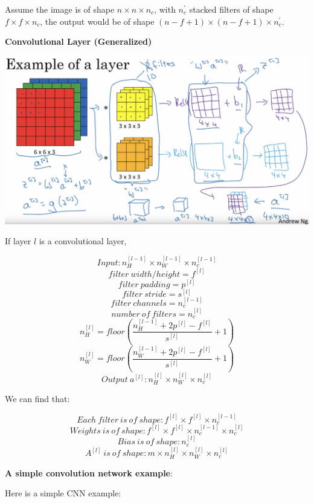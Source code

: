 \documentclass{article}
\begin{document}
\noindent Assume the image is of shape \(n \times n \times n_{c}\), with \(n_{c}^{'}\) stacked filters of shape \(f \times f \times n_{c}\), the output would be of shape \((n - f + 1) \times (n - f + 1) \times n_{c}^{'}\).

\bigskip

\noindent \textbf{Convolutional Layer (Generalized)}

\begin{center}
\includegraphics[scale=0.2]{./images/one_layer_of_a_convolutional_net.png}
\end{center}

\noindent If layer \(l\) is a convolutional layer,

\[Input: n_{H}^{[l - 1]} \times n_{W}^{[l - 1]} \times n_{c}^{[l - 1]}\]
\[filter \ width/height = f^{[l]}\]
\[filter \ padding = p^{[l]}\]
\[filter \ stride = s^{[l]}\]
\[filter \ channels = n_{c}^{[l - 1]}\]
\[number \ of \ filters = n_{c}^{[l]}\]
\[n_{H}^{[l]} = floor(\frac{n_{H}^{[l - 1]} + 2p^{[l]} - f^{[l]}}{s^{[l]}} + 1)\]
\[n_{W}^{[l]} = floor(\frac{n_{W}^{[l - 1]} + 2p^{[l]} - f^{[l]}}{s^{[l]}} + 1)\]
\[Output \ a^{[l]}: n_{H}^{[l]} \times n_{W}^{[l]} \times n_{c}^{[l]}\]

\noindent We can find that:

\[Each \ filter \ is \ of \ shape: f^{[l]} \times f^{[l]} \times n_{c}^{[l - 1]}\]
\[Weights \ is \ of \ shape: f^{[l]} \times f^{[l]} \times n_{c}^{[l - 1]} \times n_{c}^{[l]}\]
\[Bias \ is \ of \ shape: n_{c}^{[l]}\]
\[A^{[l]} \ is \ of \ shape: m \times n_{H}^{[l]} \times n_{W}^{[l]} \times n_{c}^{[l]}\]

\noindent \textbf{A simple convolution network example}:

\noindent Here is a simple CNN example:
\end{document}
